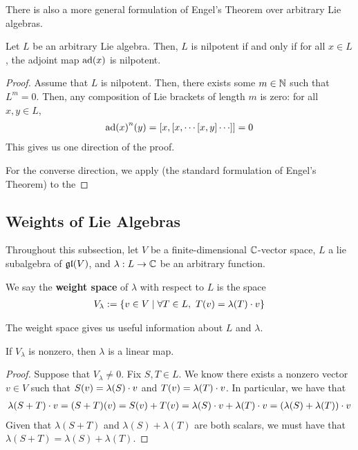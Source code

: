 There is also a more general formulation of Engel's Theorem over arbitrary Lie algebras.

\begin{boxtheorem}\label{Ch1:Thm:EngelOverAnyLie}
    Let $L$ be an arbitrary Lie algebra. Then, $L$ is nilpotent if and only if for all $x \in L$, the adjoint map $\operatorname{ad}\!\left( x \right)$ is nilpotent.
\end{boxtheorem}
\begin{proof}
    Assume that $L$ is nilpotent. Then, there exists some $m \in \mathbb{N}$ such that $L^m = 0$. Then, any composition of Lie brackets of length $m$ is zero: for all $x, y \in L$,
    \begin{align*}
        \pad{x}^n\!(y) = \brac{x, \brac{x, \cdots \brac{x, y}\cdots}} = 0
    \end{align*}
    This gives us one direction of the proof.

    For the converse direction, we apply  (the standard formulation of Engel's Theorem) to the \sorry
\end{proof}

\subsection{Weights of Lie Algebras}

Throughout this subsection, let $V$ be a finite-dimensional $\mathbb{C}$-vector space, $L$ a lie subalgebra of $\mathfrak{gl}\!\left( V \right)$, and $\lambda : L \to \mathbb{C}$ be an arbitrary function.

\begin{boxdefinition}
    We say the \textbf{weight space} of $\lambda$ with respect to $L$ %
    is the space
    \begin{align*}
        V_{\lambda} := \left\{ v \in V \; \middle\vert \; \forall T \in L, \ T\!\left( v \right) = \lambda(T) \cdot v \right\}
    \end{align*}
\end{boxdefinition}

The weight space gives us useful information about $L$ and $\lambda$.

\begin{boxlemma}
    If $V_{\lambda}$ is nonzero, then $\lambda$ is a linear map.
\end{boxlemma}
\begin{proof}
    Suppose that $V_{\lambda} \neq 0$. Fix $S, T \in L$. We know there exists a nonzero vector $v \in V$ such that $S\!\left( v \right) = \lambda(S) \cdot v$ and $T\!\left( v \right) = \lambda(T) \cdot v$. In particular, we have that
    \begin{align*}
        \lambda(S + T) \cdot v = (S + T)(v) = S\!\left( v \right) + T\!\left( v \right) = \lambda(S) \cdot v + \lambda(T) \cdot v = (\lambda(S) + \lambda(T)) \cdot v
    \end{align*}
    Given that $\lambda(S + T)$ and $\lambda(S) + \lambda(T)$ are both scalars, we must have that $\lambda(S + T) = \lambda(S) + \lambda(T)$.
\end{proof}

